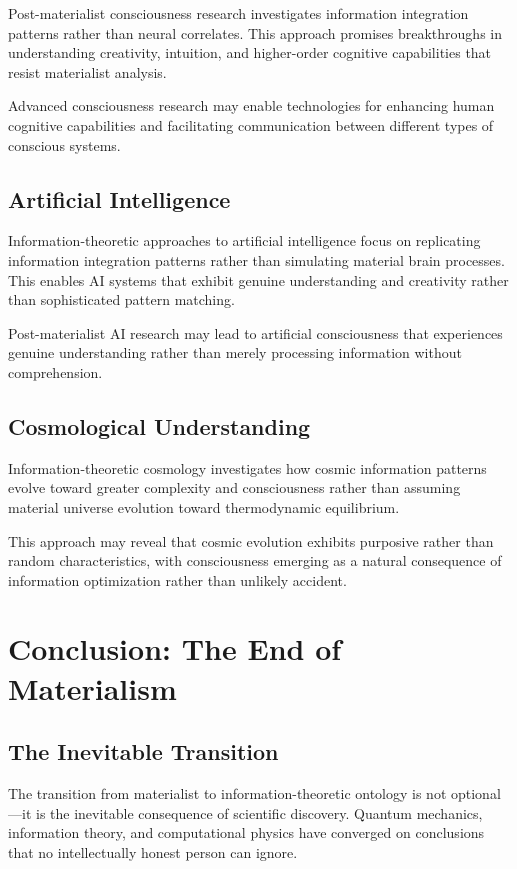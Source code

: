 \documentclass[12pt]{article}
\begin{document}
Post-materialist consciousness research investigates information integration patterns rather than neural correlates. This approach promises breakthroughs in understanding creativity, intuition, and higher-order cognitive capabilities that resist materialist analysis.

Advanced consciousness research may enable technologies for enhancing human cognitive capabilities and facilitating communication between different types of conscious systems.

\subsection{Artificial Intelligence}

Information-theoretic approaches to artificial intelligence focus on replicating information integration patterns rather than simulating material brain processes. This enables AI systems that exhibit genuine understanding and creativity rather than sophisticated pattern matching.

Post-materialist AI research may lead to artificial consciousness that experiences genuine understanding rather than merely processing information without comprehension.

\subsection{Cosmological Understanding}

Information-theoretic cosmology investigates how cosmic information patterns evolve toward greater complexity and consciousness rather than assuming material universe evolution toward thermodynamic equilibrium.

This approach may reveal that cosmic evolution exhibits purposive rather than random characteristics, with consciousness emerging as a natural consequence of information optimization rather than unlikely accident.

\section{Conclusion: The End of Materialism}

\subsection{The Inevitable Transition}

The transition from materialist to information-theoretic ontology is not optional—it is the inevitable consequence of scientific discovery. Quantum mechanics, information theory, and computational physics have converged on conclusions that no intellectually honest person can ignore.
\end{document}
